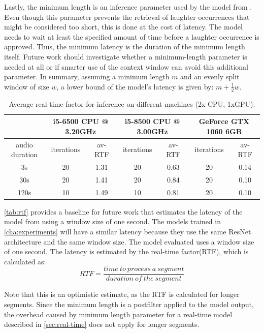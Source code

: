 \documentclass[bsc,frontabs,parskip,deptreport]{infthesis}
\begin{document}
Lastly, the minimum length is an inference parameter used by the model from \citet{gillick2021robust}. Even though this parameter prevents the retrieval of laughter occurrences that might be considered too short, this is done at the cost of latency. The model needs to wait at least the specified amount of time before a laughter occurrence is approved. Thus, the minimum latency is the duration of the minimum length itself.
Future work should investigate whether a minimum-length parameter is needed at all or if smarter use of the context window can avoid this additional parameter.
In summary, assuming a minimum length $m$ and an evenly split window of size $w$, a lower bound of the model's latency is given by: $m + \frac{1}{2}w$.

\begin{table}[h!]
    \hspace{-2cm}
    \begin{tabular}{|c|c|c|c|c|c|c|}
    \hline
    & \multicolumn{2}{|c|}{i5-6500 CPU @ 3.20GHz} &
    \multicolumn{2}{|c|}{i5-8500 CPU @ 3.00GHz} & 
    \multicolumn{2}{|c|}{GeForce GTX 1060 6GB} \\ 
    \hline
    audio duration & iterations & av-RTF &
    iterations & av-RTF & iterations & av-RTF \\
    \hline
    3s & 20 & 1.31   & 20 & 0.63  & 20 & 0.14  \\
    30s & 20 & 1.41  & 20 & 0.84  & 20 & 0.10 \\
    120s & 10 & 1.49 &  10 & 0.81  & 20 & 0.10 \\
    \hline
    \end{tabular}
    \caption{Average real-time factor for inference on different machines (2x CPU, 1xGPU).}
    \label{tab:rtf}
\end{table}

\autoref{tab:rtf} provides a baseline for future work that estimates the latency of the model from \citet{gillick2021robust} using a window size of one second. The models trained in \autoref{cha:experiments} will have a similar latency because they use the same ResNet architecture and the same window size. 
The model evaluated uses a window size of one second. 
The latency is estimated by the real-time factor(RTF), which is calculated as: 
$$ RTF = \frac{time\ to\ process\ a\ segment}{duration\ of\ the\ segment} $$

Note that this is an optimistic estimate, as the RTF is calculated for longer segments.
Since the minimum length is a postfilter applied to the model output, the overhead caused by minimum length parameter for a real-time model described in \autoref{sec:real-time} does not apply for longer segments. 
\end{document}
